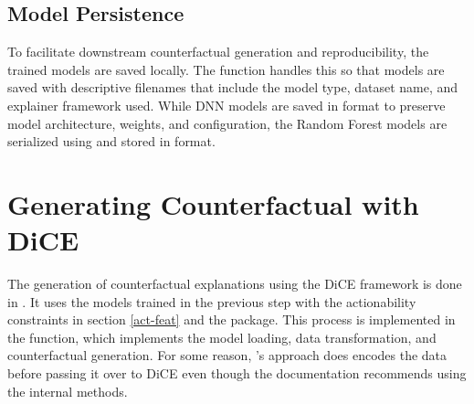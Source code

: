 \begin{table}[htbp]
\centering
\hspace*{-2.5cm}
\caption{Table displaying the performance metrics for AIDE's DNN Classifier on the Datasets (Rounded to Two Decimal Places).}
\end{table}

\subsection{Model Persistence}
To facilitate downstream counterfactual generation and reproducibility, the trained models are saved locally. The  function handles this so that models are saved with descriptive filenames that include the model type, dataset name, and explainer framework used. While DNN models are saved in  format to preserve model architecture, weights, and configuration, the Random Forest models are serialized using  and stored in  format.

\section{Generating Counterfactual with DiCE}
The generation of counterfactual explanations using the DiCE framework is done in . It uses the models trained in the previous step with the actionability constraints in section \ref{act-feat} and the  package. This process is implemented in the  function, which implements the model loading, data transformation, and counterfactual generation. For some reason, \citet{guidotti2024counterfactual}'s approach does encodes the data before passing it over to DiCE even though the documentation recommends using the internal methods.

